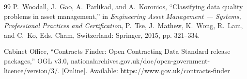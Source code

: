 \documentclass[conference]{IEEEtran}
\begin{document}
\begin{thebibliography}{99}
P.~Woodall, J.~Gao, A.~Parlikad, and A.~Koronios, ``Classifying data quality
  problems in asset management,'' in \emph{Engineering Asset Management ---
  Systems, Professional Practices and Certification}, P.~Tse, J.~Mathew,
  K.~Wong, R.~Lam, and C.~Ko, Eds. Cham, Switzerland: Springer, 2015, pp.
  321--334.

Cabinet Office, ``Contracts Finder: Open Contracting Data Standard release
  packages,'' OGL v3.0, nationalarchives.gov.uk/doc/open-government-licence/version/3/.
  [Online]. Available: https://www.gov.uk/contracts-finder

\end{thebibliography}
\end{document}
